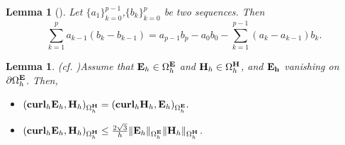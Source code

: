 \documentclass[12pt,reqno]{amsart}
\newcommand{\curl}{{\bf curl}}
\newcommand{\e}{{\bf E}}
\newcommand{\h}{{\bf H}}
\newtheorem{lem}[theorem]{Lemma}
\newtheorem{lemma}[theorem]{Lemma}
\theoremstyle{definition}
\numberwithin{equation}{section}
\def\Gwh{\Omega_h}
\begin{document}
\begin{lem}[\cite{Morton}]
Let $\{a_1\}_{k=0}^{p-1}$,$\{b_k\}_{k=0}^{p}$ be two sequences. Then
$$
\sum_{k=1}^{p}a_{k-1}(b_k-b_{k-1})=a_{p-1}b_p-a_{0}b_0-\sum_{k=1}^{p-1}(a_{k}-a_{k-1})b_k.
$$
\end{lem}



\begin{lemma}(cf. \cite[(37)]{sakka} )\label{lem:sym}
	Assume that $\e_h\in \Gwh^\e$ and $\h_h\in \Gwh^\h$, and
	$\bf{E}_h$ vanishing on $\partial \Gwh^{\bf{E}}$. Then,
	\begin{itemize}
		\item  
		$
		(\curl_h\e_h,\h_h)_{\Gwh^\h}=
		(\curl_h\h_h,\e_h)_{\Gwh^\e}.
		$\\[1mm]
		\item $(\curl _h\e_h,\h_h)_{\Gwh^\h}\leq
		  \frac{2\sqrt{3}}{h}\|\e_h\|_{\Gwh^\e}
		\|\h_h\|_{\Gwh^\h}
		$.

	\end{itemize}

\end{lemma}
\end{document}

